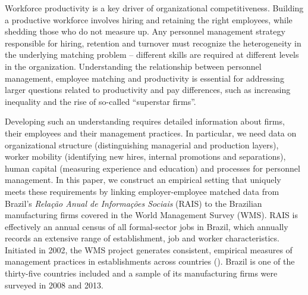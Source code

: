 Workforce productivity is a key driver of organizational competitiveness.  
Building a productive workforce involves hiring and retaining the right employees, while shedding those who do not measure up. Any personnel management strategy responsible for hiring, retention and turnover must recognize the heterogeneity in the underlying matching problem -- different skills are required at different levels in the organization. Understanding the relationship between personnel management, employee matching and productivity is essential for addressing larger questions related to productivity and pay differences, such as increasing inequality and the rise of so-called ``superstar firms''.  

Developing such an understanding requires detailed information about firms, their employees and their management practices. In particular, we need data on organizational structure (distinguishing managerial and production layers), worker mobility (identifying new hires, internal promotions and separations), human capital (measuring experience and education) and processes for personnel management.  In this paper, we construct an empirical setting that uniquely meets these requirements by linking employer-employee matched data from Brazil's \emph{Rela\c{c}\~{a}o Anual de Informa\c{c}\~{o}es Sociais} (RAIS) to the Brazilian manufacturing firms covered in the World Management Survey (WMS). RAIS is effectively an annual census of all formal-sector jobs in Brazil, which annually records an extensive range of establishment, job and worker characteristics. Initiated in 2002, the WMS project generates consistent, empirical measures of management practices in establishments across countries (\citep{Bloom:NewEmpirical:WP:2014}).  Brazil is one of the thirty-five countries included and a sample of its manufacturing firms were surveyed in 2008 and 2013. 

